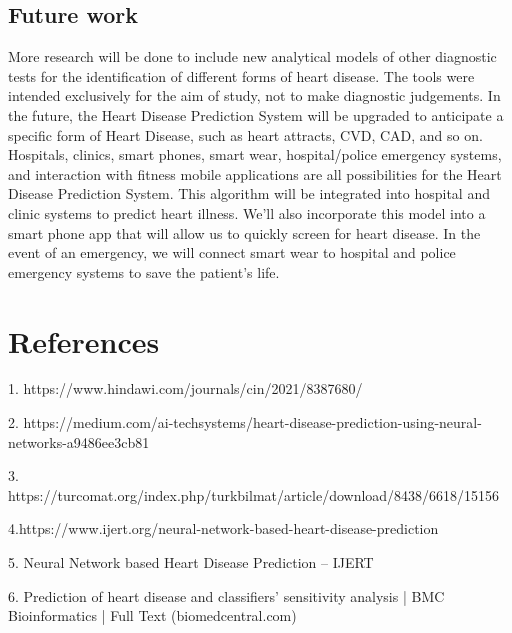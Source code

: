\documentclass[12pt]{article}
\begin{document}
\subsection{Future work}
More research will be done to include new analytical models of other diagnostic tests for the identification of different forms of heart disease. The tools were intended exclusively for the aim of study, not to make diagnostic judgements. In the future, the Heart Disease Prediction System will be upgraded to anticipate a specific form of Heart Disease, such as heart attracts, CVD, CAD, and so on. Hospitals, clinics, smart phones, smart wear, hospital/police emergency systems, and interaction with fitness mobile applications are all possibilities for the Heart Disease Prediction System. This algorithm will be integrated into hospital and clinic systems to predict heart illness. We'll also incorporate this model into a smart phone app that will allow us to quickly screen for heart disease. In the event of an emergency, we will connect smart wear to hospital and police emergency systems to save the patient's life.
 
\section{References}
 
 1. https://www.hindawi.com/journals/cin/2021/8387680/

2. https://medium.com/ai-techsystems/heart-disease-prediction-using-neural-networks-a9486ee3cb81

3. https://turcomat.org/index.php/turkbilmat/article/download/8438/6618/15156

4.https://www.ijert.org/neural-network-based-heart-disease-prediction

5. Neural Network based Heart Disease Prediction – IJERT

6. Prediction of heart disease and classifiers’ sensitivity analysis | BMC Bioinformatics | Full Text (biomedcentral.com)
 
\end{document}
